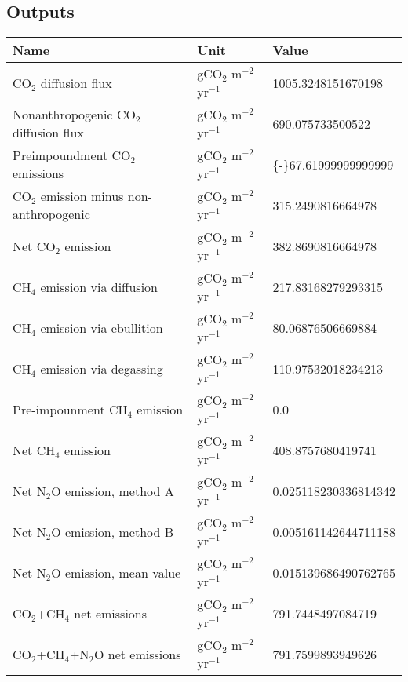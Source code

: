 \documentclass{article}%
\begin{document}
%
\subsection{Outputs}%
\label{subsec:Outputs}%
\begin{center}%
\renewcommand{\arraystretch}{1.0}%
\begin{tabu}{@{}p{10cm} X[c] X[l]@{}}%
\toprule%
\textbf{Name}&\textbf{Unit}&\textbf{Value}\\%
\midrule%
CO$_2$ diffusion flux&gCO$_2$ m$^{-2}$ yr$^{-1}$&\num[round-precision=4,round-mode=figures]{1005.3248151670198}\\%
Nonanthropogenic CO$_2$ diffusion flux&gCO$_2$ m$^{-2}$ yr$^{-1}$&\num[round-precision=4,round-mode=figures]{690.075733500522}\\%
Preimpoundment CO$_2$ emissions&gCO$_2$ m$^{-2}$ yr$^{-1}$&\num[round-precision=4,round-mode=figures]{{-}67.61999999999999}\\%
CO$_2$ emission minus non-anthropogenic&gCO$_2$ m$^{-2}$ yr$^{-1}$&\num[round-precision=4,round-mode=figures]{315.2490816664978}\\%
Net CO$_2$ emission&gCO$_2$ m$^{-2}$ yr$^{-1}$&\num[round-precision=4,round-mode=figures]{382.8690816664978}\\%
CH$_4$ emission via diffusion&gCO$_2$ m$^{-2}$ yr$^{-1}$&\num[round-precision=4,round-mode=figures]{217.83168279293315}\\%
CH$_4$ emission via ebullition&gCO$_2$ m$^{-2}$ yr$^{-1}$&\num[round-precision=4,round-mode=figures]{80.06876506669884}\\%
CH$_4$ emission via degassing&gCO$_2$ m$^{-2}$ yr$^{-1}$&\num[round-precision=4,round-mode=figures]{110.97532018234213}\\%
Pre-impounment CH$_4$ emission&gCO$_2$ m$^{-2}$ yr$^{-1}$&\num[round-precision=4,round-mode=figures]{0.0}\\%
Net CH$_4$ emission&gCO$_2$ m$^{-2}$ yr$^{-1}$&\num[round-precision=4,round-mode=figures]{408.8757680419741}\\%
Net N$_2$O emission, method A&gCO$_2$ m$^{-2}$ yr$^{-1}$&\num[round-precision=4,round-mode=figures]{0.025118230336814342}\\%
Net N$_2$O emission, method B&gCO$_2$ m$^{-2}$ yr$^{-1}$&\num[round-precision=4,round-mode=figures]{0.005161142644711188}\\%
Net N$_2$O emission, mean value&gCO$_2$ m$^{-2}$ yr$^{-1}$&\num[round-precision=4,round-mode=figures]{0.015139686490762765}\\%
\midrule%
CO$_2$+CH$_4$ net emissions&gCO$_2$ m$^{-2}$ yr$^{-1}$&\num[round-precision=4,round-mode=figures]{791.7448497084719}\\%
\midrule%
CO$_2$+CH$_4$+N$_2$O net emissions&gCO$_2$ m$^{-2}$ yr$^{-1}$&\num[round-precision=4,round-mode=figures]{791.7599893949626}\\\bottomrule%
%
\end{tabu}%
\end{center}%
\end{document}
